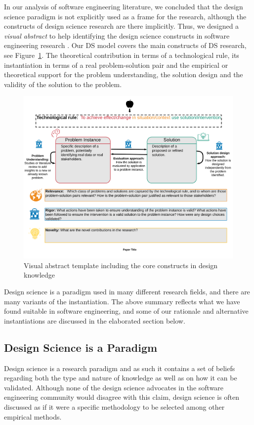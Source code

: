 \documentclass[graybox]{svmult}
\begin{document}
In our analysis of software engineering literature, we concluded that the design science paradigm is not explicitly used as a frame for the research, although the constructs of design science research are there implicitly. Thus, we designed a \emph{visual abstract} to help identifying the design science constructs in software engineering research \cite{StoreyESEM17}. 
Our DS model covers the main constructs of DS research, see Figure~\ref{fig:VA-template}. The theoretical contribution in terms of a technological rule, its instantiation in terms of a real problem-solution pair and the empirical or theoretical support for the problem understanding, the solution design and the validity of the solution to the problem.
\begin{figure}
  \includegraphics[width=1.0\textwidth]{Figures/GenericVA.png}
\caption{Visual abstract template including the core constructs in design knowledge}
\label{fig:VA-template}       %
\end{figure}

Design science is a paradigm used in many different research fields, and there are many variants of the instantiation. The above summary reflects what we have found suitable in software engineering, and some of our rationale and alternative instantiations are discussed in the elaborated section below.


\subsection{Design Science is a Paradigm}
Design science is a research paradigm and as such it contains a set of beliefs regarding both the type and nature of knowledge as well as on how it can be validated. Although none of the design science advocates in the software engineering community would disagree with this claim, design science is often discussed as if it were a specific methodology to be selected among other empirical methods. 
\end{document}
